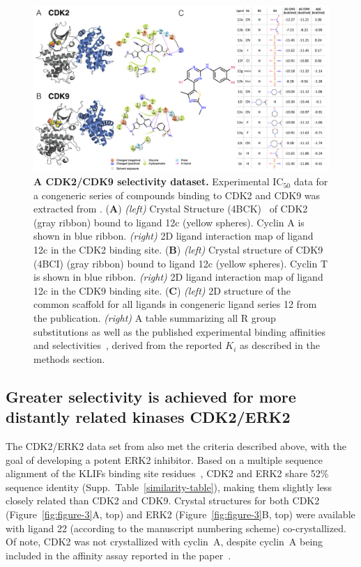 \documentclass[phd,tocprelim]{cornell}
\begin{document}
\begin{landscape}
\begin{figure}[p]
\centering
	\includegraphics[width=1.0\linewidth]{figures/figure2.png}
	\caption[A CDK2/CDK9 selectivity dataset.]{{\bf A CDK2/CDK9 selectivity dataset.}
		Experimental IC$_{50}$ data for a congeneric series of compounds binding to CDK2 and CDK9 was extracted from \citet{Shao2013-oe}.
		({\bf A})  \emph{(left)} Crystal Structure (4BCK)~\citep{Hole2013-sr} of CDK2 (gray ribbon)  bound to ligand 12c (yellow spheres). 
		Cyclin A is shown in blue ribbon.
		\emph{(right)} 2D ligand interaction map of ligand 12c in the CDK2 binding site. 
		({\bf B}) \emph{(left)} Crystal structure of CDK9 (4BCI)\citep{Hole2013-sr} (gray ribbon) bound to ligand 12c (yellow spheres). 
		Cyclin T is shown in blue ribbon. 
		\emph{(right)} 2D ligand interaction map of ligand 12c in the CDK9 binding site.
		({\bf C}) \emph{(left)} 2D structure of the common scaffold for all ligands in congeneric ligand series 12 from the publication.
		\emph{(right)} A table summarizing all R group substitutions as well as the published experimental binding affinities and selectivities~\citep{Shao2013-oe}, derived from the reported $K_i$ as described in the methods section. 
	}
	\label{fig:figure-2}
\end{figure}
\end{landscape}

\subsection{Greater selectivity is achieved for more distantly related kinases CDK2/ERK2}
The CDK2/ERK2 data set from \citet{Blake2016-su} also met the criteria described above, with the goal of developing a potent ERK2 inhibitor. 
Based on a multiple sequence alignment of the KLIFs binding site residues~\cite{Kooistra:2016fr,vanLinden:2014ea}, CDK2 and ERK2 share 52\% sequence identity (Supp.\ Table~\ref{similarity-table}), making them slightly less closely related than CDK2 and CDK9. Crystal structures for both CDK2 (Figure~\ref{fig:figure-3}A, top) and ERK2 (Figure~\ref{fig:figure-3}B, top) were available with ligand 22 (according to the manuscript numbering scheme) co-crystallized. 
Of note, CDK2 was not crystallized with cyclin~A, despite cyclin~A being included in the affinity assay reported in the paper~\citep{Blake2016-su}. 
\end{document}
